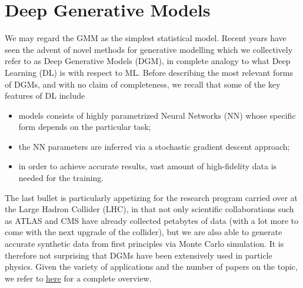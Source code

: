 \section{Deep Generative Models}
We may regard the GMM as the simplest statistical model. Recent years have seen the advent of novel methods for generative modelling which we collectively refer to as Deep Generative Models (DGM), in complete analogy to what Deep Learning (DL) is with respect to ML. Before describing the most relevant forms of DGMs, and with no claim of completeness, we recall that some of the key features of DL include
\begin{itemize}
\item
models consists of highly parametrized Neural Networks (NN) whose specific form depends on the particular task;
\item
the NN parameters are inferred via a stochastic gradient descent approach;
\item
in order to achieve accurate results, vast amount of high-fidelity data is needed for the training.
\end{itemize}
The last bullet is particularly appetizing for the research program carried over at the Large Hadron Collider (LHC), in that not only scientific collaborations such as ATLAS and CMS have already collected petabytes of data (with a lot more to come with the next upgrade of the collider), but we are also able to generate accurate synthetic data from first principles via Monte Carlo simulation. It is therefore not surprising that DGMs have been extensively used in particle physics. Given the variety of applications and the number of papers on the topic, we refer to \href{https://github.com/iml-wg/HEPML-LivingReview}{here} for a complete overview.

